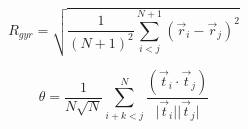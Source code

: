 \documentclass{article}
\begin{document}
\[ R_{gyr} = \sqrt{\frac{1}{(N+1)^2} \sum_{i<j}^{N+1} \left( \vec{r}_i-\vec{r}_j \right)^2} \]
\pagebreak

\[ \theta = \frac{1}{N\sqrt {N}} \sum_{i+k<j}^N \frac{(\vec{t}_i\cdot \vec{t}_j)}{\vert\vec{t}_i\vert\vert\vec{t}_j\vert} \]
\pagebreak
\end{document}
